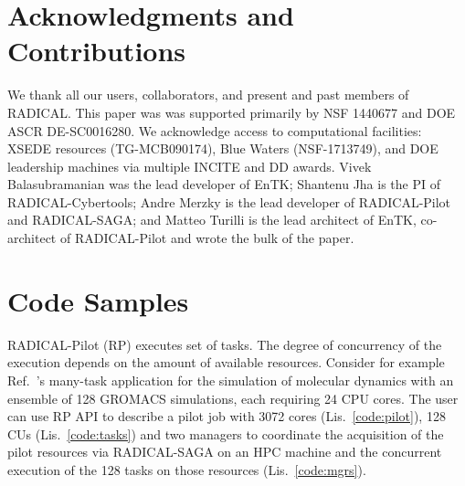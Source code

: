 \documentclass[preprint,12pt, a4paper]{elsarticle}
\begin{document}
\section*{Acknowledgments and Contributions}

We thank all our users, collaborators, and present and past members of
RADICAL\@. This paper was was supported primarily by NSF 1440677 and DOE ASCR
{DE-SC0016280}. We acknowledge access to computational facilities: XSEDE
resources (TG-MCB090174), Blue Waters (NSF-1713749), and DOE leadership machines
via multiple INCITE and DD awards. Vivek Balasubramanian was the lead developer
of EnTK\@; Shantenu Jha is the PI of RADICAL-Cybertools; Andre Merzky is the
lead developer of RADICAL-Pilot and RADICAL-SAGA\@; and Matteo Turilli is the
lead architect of EnTK, co-architect of RADICAL-Pilot and wrote the bulk of the
paper.




\newpage
\appendix


\section*{Code Samples}\label{sec:metadata}

RADICAL-Pilot (RP) executes set of tasks. The degree of concurrency of the
execution depends on the amount of available resources. Consider for example
Ref.~\cite{balasubramanian2016extasy}'s many-task application for the simulation
of molecular dynamics with an ensemble of 128 GROMACS simulations, each
requiring 24 CPU cores. The user can use RP API to describe a pilot job with
3072 cores (Lis.~\ref{code:pilot}), 128 CUs (Lis.~\ref{code:tasks}) and two
managers to coordinate the acquisition of the pilot resources via RADICAL-SAGA
on an HPC machine and the concurrent execution of the 128 tasks on those
resources (Lis.~\ref{code:mgrs}).
\end{document}
